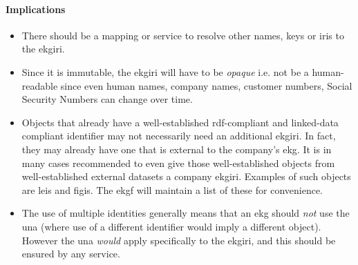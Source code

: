 \paragraph{Implications}

\begin{itemize}
    \item There should be a mapping or service to resolve other names, keys or \glspl{iri} to the \gls{ekgiri}.
    \item Since it is immutable, the \gls{ekgiri} will have to be \textit{opaque} i.e. not be a human-readable
          since even human names, company names, customer numbers, Social Security Numbers can change over time.
    \item Objects that already have a well-established \gls{rdf}-compliant and \gls{linked-data} compliant identifier
          may not necessarily need an additional \gls{ekgiri}.
          In fact, they may already have one that is external to the company's \gls{ekg}.
          It is in many cases recommended to even give those well-established objects from well-established external
          datasets a company \gls{ekgiri}. Examples of such objects are \glspl{lei} and \glspl{figi}.
          The \gls{ekgf} will maintain a list of these for convenience.
    \item The use of multiple identities generally means that an \gls{ekg} should \textit{not}
          use the \gls{una} (where use of a different identifier would imply a different object).
          However the \gls{una} \textit{would} apply specifically to the \gls{ekgiri},
          and this should be ensured by any service.
\end{itemize}
  
